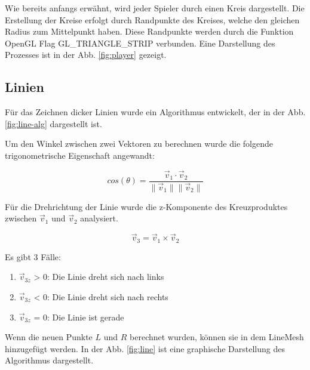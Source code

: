 \documentclass[doktyp=studarbeit]{TUBAFarbeiten}
\begin{document}
Wie bereits anfangs erwähnt, wird jeder Spieler durch einen Kreis dargestellt. 
Die Erstellung der Kreise erfolgt durch Randpunkte des Kreises, welche den gleichen Radius zum Mittelpunkt haben. Diese Randpunkte werden durch die Funktion OpenGL Flag GL\_TRIANGLE\_STRIP verbunden. Eine Darstellung des Prozesses
ist in der Abb. \ref{fig:player} gezeigt.

\subsection{Linien}

Für das Zeichnen dicker Linien wurde ein Algorithmus entwickelt, der
in der Abb. \ref{fig:line-alg} dargestellt ist. 

Um den Winkel zwischen zwei Vektoren zu berechnen wurde die folgende 
trigonometrische Eigenschaft angewandt:

\begin{equation}
    cos(\theta)=
    \frac{\vec{v}_{1} \cdot \vec{v}_{2}}{
        \lVert \vec{v}_{1} \rVert 
        \lVert \vec{v}_{2} \rVert
    }
\end{equation}

Für die Drehrichtung der Linie wurde die z-Komponente des
Kreuzproduktes zwischen $\vec{v}_{1}$ und $\vec{v}_{2}$ analysiert.

\begin{equation}
    \vec{v}_{3} = \vec{v}_{1} \times \vec{v}_{2}
\end{equation}

Es gibt 3 Fälle:
\begin{enumerate}
    \item $\vec{v}_{3z}$ > 0: Die Linie dreht sich nach links
    \item $\vec{v}_{3z}$ < 0: Die Linie dreht sich nach rechts
    \item $\vec{v}_{3z}$ = 0: Die Linie ist gerade
\end{enumerate}

Wenn die neuen Punkte $L$ und $R$ berechnet wurden, können sie in dem LineMesh
hinzugefügt werden.
In der Abb. \ref{fig:line} ist eine graphische Darstellung des Algorithmus dargestellt.
\end{document}
